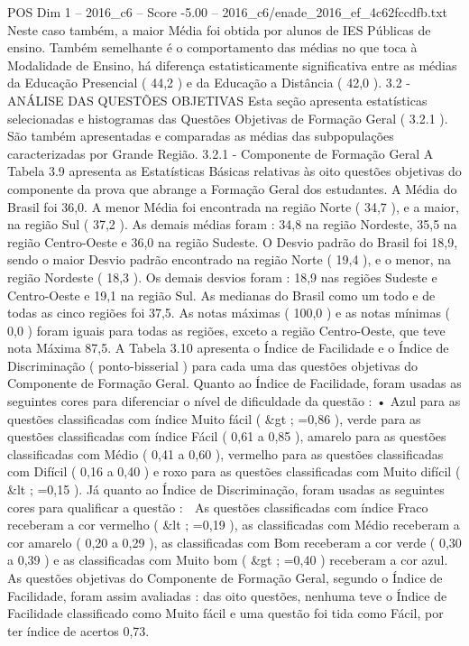 \begin{textsample}{POS Dim 1 – 2016\_c6 – Score -5.00 – 2016\_c6/enade\_2016\_ef\_4c62fccdfb.txt}
Neste caso também, a maior Média foi obtida por alunos de IES Públicas de ensino.
Também semelhante é o comportamento das médias no que toca à Modalidade de Ensino, há diferença estatisticamente significativa entre as médias da Educação Presencial ( 44,2 ) e da Educação a Distância ( 42,0 ). 3.2 - ANÁLISE DAS QUESTÕES OBJETIVAS Esta seção apresenta estatísticas selecionadas e histogramas das Questões Objetivas de Formação Geral ( 3.2.1 ).
São também apresentadas e comparadas as médias das subpopulações caracterizadas por Grande Região. 3.2.1 - Componente de Formação Geral A Tabela 3.9 apresenta as Estatísticas Básicas relativas às oito questões objetivas do componente da prova que abrange a Formação Geral dos estudantes.
A Média do Brasil foi 36,0.
A menor Média foi encontrada na região Norte ( 34,7 ), e a maior, na região Sul ( 37,2 ).
As demais médias foram : 34,8 na região Nordeste, 35,5 na região Centro-Oeste e 36,0 na região Sudeste.
O Desvio padrão do Brasil foi 18,9, sendo o maior Desvio padrão encontrado na região Norte ( 19,4 ), e o menor, na região Nordeste ( 18,3 ).
Os demais desvios foram : 18,9 nas regiões Sudeste e Centro-Oeste e 19,1 na região Sul.
As medianas do Brasil como um todo e de todas as cinco regiões foi 37,5.
As notas máximas ( 100,0 ) e as notas mínimas ( 0,0 ) foram iguais para todas as regiões, exceto a região Centro-Oeste, que teve nota Máxima 87,5.
A Tabela 3.10 apresenta o Índice de Facilidade e o Índice de Discriminação ( ponto-bisserial ) para cada uma das questões objetivas do Componente de Formação Geral.
Quanto ao Índice de Facilidade, foram usadas as seguintes cores para diferenciar o nível de dificuldade da questão : • Azul para as questões classificadas com índice Muito fácil ( \&gt ; =0,86 ), verde para as questões classificadas com índice Fácil ( 0,61 a 0,85 ), amarelo para as questões classificadas com Médio ( 0,41 a 0,60 ), vermelho para as questões classificadas com Difícil ( 0,16 a 0,40 ) e roxo para as questões classificadas com Muito difícil ( \&lt ; =0,15 ).
Já quanto ao Índice de Discriminação, foram usadas as seguintes cores para qualificar a questão :  As questões classificadas com índice Fraco receberam a cor vermelho ( \&lt ; =0,19 ), as classificadas com Médio receberam a cor amarelo ( 0,20 a 0,29 ), as classificadas com Bom receberam a cor verde ( 0,30 a 0,39 ) e as classificadas com Muito bom ( \&gt ; =0,40 ) receberam a cor azul.
As questões objetivas do Componente de Formação Geral, segundo o Índice de Facilidade, foram assim avaliadas : das oito questões, nenhuma teve o Índice de Facilidade classificado como Muito fácil e uma questão foi tida como Fácil, por ter índice de acertos 0,73.

\end{textsample}
